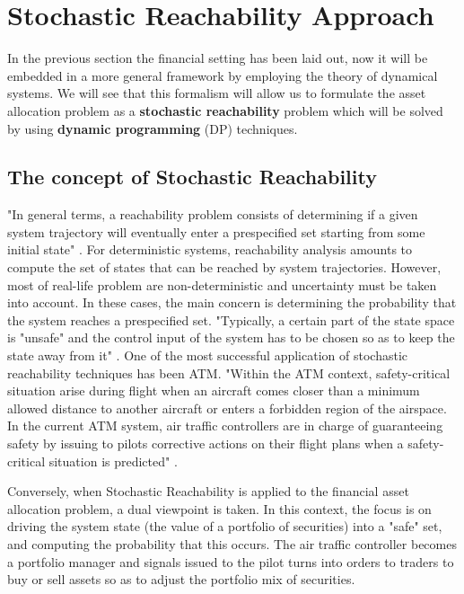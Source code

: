\section{Stochastic Reachability Approach}
In the previous section the financial setting has been laid out, now it will be embedded in a more general framework by employing the theory of dynamical systems. We will see that this formalism will allow us to formulate the asset allocation problem as a \textbf{stochastic reachability} problem which will be solved by using \textbf{dynamic programming} (DP) techniques.
\subsection{The concept of Stochastic Reachability}
"In general terms, a reachability problem consists of determining if a given system trajectory will eventually enter a prespecified set starting from some initial state" \cite{Boj2012}. For deterministic systems, reachability analysis amounts to compute the set of states that can be reached by system trajectories. However, most of real-life problem are non-deterministic and uncertainty must be taken into account. In these cases, the main concern is determining the probability that the system reaches a prespecified set. "Typically, a certain part of the state space is "unsafe" and the control input of the system has to be chosen so as to keep the state away from it" \cite{Boj2012}. One of the most successful application of stochastic reachability techniques has been \gls{ATM}. "Within the \gls{ATM} context, safety-critical situation arise during flight when an aircraft comes closer than a minimum allowed distance to another aircraft or enters a forbidden region of the airspace. In the current \gls{ATM} system, air traffic controllers are in charge of guaranteeing safety by issuing to pilots corrective actions on their flight plans when a safety-critical situation is predicted" \cite{Boj2012}.

Conversely, when Stochastic Reachability is applied to the financial asset allocation problem, a dual viewpoint is taken. In this context, the focus is on driving the system state (the value of a portfolio of securities) into a "safe" set, and computing the probability that this occurs. The air traffic controller becomes a portfolio manager and signals issued to the pilot turns into orders to traders to buy or sell assets so as to adjust the portfolio mix of securities.
